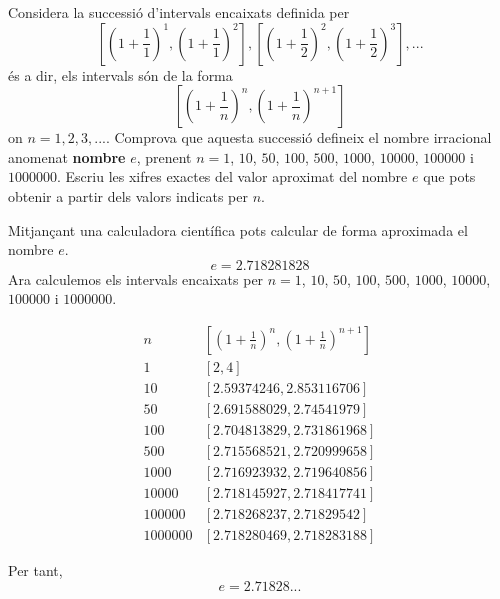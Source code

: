 \begin{exercici}
Considera la successió d’intervals encaixats definida per 
\begin{equation*}
\left[ \left( 1+\frac{1}{1}\right) ^{1},\left( 1+\frac{1}{1}\right) ^{2}%
\right] ,\left[ \left( 1+\frac{1}{2}\right) ^{2},\left( 1+\frac{1}{2}\right)
^{3}\right] ,...
\end{equation*}%
és a dir, els intervals són de la forma%
\begin{equation*}
\left[ \left( 1+\frac{1}{n}\right) ^{n},\left( 1+\frac{1}{n}\right) ^{n+1}%
\right]
\end{equation*}%
on $n=1,2,3,...$. Comprova que aquesta successió defineix el nombre
irracional anomenat \textbf{nombre }$e$, prenent $n=1$, $10$, $50$, $%
100$, $500$, $1000$, $10000$, $100000$ i $1000000$. Escriu les xifres
exactes del valor aproximat del nombre $e$ que pots obtenir a partir
dels valors indicats per $n$.

\end{exercici}

\begin{solucio}
Mitjançant una calculadora científica pots calcular de forma aproximada
el nombre $e$.%
\begin{equation*}
e=2.718281828
\end{equation*}%
Ara calculemos els intervals encaixats per $n=1$, $10$, $50$, $100$, $%
500 $, $1000$, $10000$, $100000$ i $1000000$.

\begin{equation*}
\begin{array}{c|c}
n & \left[ \left( 1+\frac{1}{n}\right) ^{n},\left( 1+\frac{1}{n}\right)
^{n+1}\right] \\ \hline
1 & \left[ 2,4\right] \\ 
10 & \left[ 2.59374246,2.853116706\right] \\ 
50 & \left[ 2.691588029,2.74541979\right] \\ 
100 & \left[ 2.704813829,2.731861968\right] \\ 
500 & \left[ 2.715568521,2.720999658\right] \\ 
1000 & \left[ 2.716923932,2.719640856\right] \\ 
10000 & \left[ 2.718145927,2.718417741\right] \\ 
100000 & \left[ 2.718268237,2.71829542\right] \\ 
1000000 & \left[ 2.718280469,2.718283188\right]%
\end{array}%
\end{equation*}

Per tant, 
\begin{equation*}
e=2.71828...
\end{equation*}
\end{solucio}

